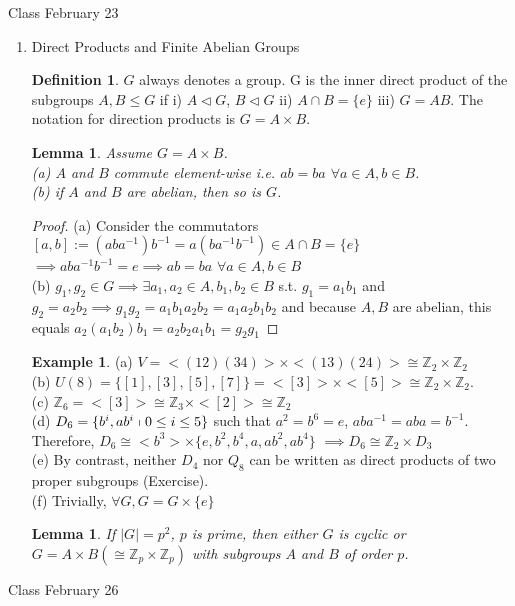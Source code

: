 \documentclass[11pt]{article}
\newtheorem{lem}[thm]{Lemma}
\theoremstyle{definition}
\newtheorem{definition}[thm]{Definition}
\newtheorem{example}[thm]{Example}
\numberwithin{equation}{section}
\newcommand{\Z}{\mathbb{Z}}
\begin{document}
\begin{center}
{\sf\LARGE Class February 23}
\end{center}

\begin{enumerate} %

\item Direct Products and Finite Abelian Groups
\begin{definition}
$G$ always denotes a group. G is the inner direct product of the subgroups $A, B \leq G$ if i) $A \vartriangleleft G$, $B \vartriangleleft G$ ii) $A \cap B = \{e\}$ iii) $G = AB$. The notation for direction products is $G = A \times B$.
\end{definition}
\begin{lem}
Assume $G = A \times B$. \\
(a) $A$ and $B$ commute element-wise i.e. $ab = ba$ $\forall a \in A, b \in B$.\\
(b) if $A$ and $B$ are abelian, then so is $G$.
\end{lem}
\begin{proof}
(a) Consider the commutators $[a, b] := (aba^{-1})b^{-1} = a(ba^{-1}b^{-1}) \in A \cap B = \{e\}$\\
$\implies aba^{-1}b^{-1} = e \implies ab = ba$ $\forall a \in A, b \in B$\\
(b) $g_1, g_2 \in G \implies \exists a_1, a_2 \in A, b_1, b_2 \in B$ s.t. $g_1 = a_{1}b_{1}$ and $g_2 = a_{2}b_{2} \implies g_{1}g_{2} = a_{1}b_{1}a_{2}b_{2} = a_{1}a_{2}b_{1}b_{2}$ and because $A, B$ are abelian, this equals $a_{2}(a_{1}b_{2})b_{1} = a_{2}b_{2}a_{1}b_{1} = g_{2}g_{1}$
\end{proof}
\begin{example}
(a) $V = <(12)(34)> \times <(13)(24)> \cong \Z_2 \times \Z_2 $\\
(b) $U(8) = \{[1], [3], [5], [7]\} = <[3]> \times <[5]> \cong \Z_2 \times \Z_2$.\\
(c) $\Z_6 = <[3]> \cong \Z_3 \times <[2]> \cong \Z_2$\\
(d) $D_6 = \{b^{i}, ab^{i} \shortmid 0 \leq i \leq 5 \}$ such that $a^{2} = b^{6} = e$, $aba^{-1} = aba = b^{-1}$. Therefore, $D_6 \cong <b^{3}> \times \{e, b^{2}, b^{4}, a, ab^{2}, ab^{4}\}$ $\implies D_6 \cong \Z_2 \times D_3$\\
(e) By contrast, neither $D_4$ nor $Q_8$ can be written as direct products of two proper subgroups (Exercise).\\
(f) Trivially, $\forall G, G = G \times \{e\}$
\end{example}
\begin{lem}
If $|G| = p^{2}$, $p$ is prime, then either $G$ is cyclic or $G = A \times B (\cong \Z_p \times \Z_p)$ with subgroups $A$ and $B$ of order $p$.
\end{lem}
\end{enumerate}

\begin{center}
{\sf\LARGE Class February 26}
\end{center}
\end{document}
